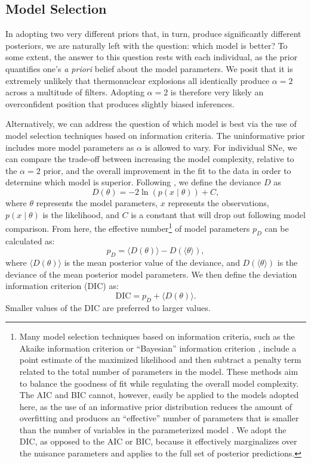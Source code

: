 \documentclass[twocolumn]{./aastex63}
\begin{document}
\subsection{Model Selection}\label{sec:dic}

In adopting two very different priors that, in turn, produce significantly
different posteriors, we are naturally left with the question: which model is
better? To some extent, the answer to this question rests with each
individual, as the prior quantifies one's \textit{a priori} belief about the
model parameters. We posit that it is extremely unlikely that thermonuclear
explosions all identically produce $\alpha = 2$ across a multitude of filters.
Adopting $\alpha = 2$ is therefore very likely an overconfident position that
produces slightly biased inferences.

Alternatively, we can address the question of which model is best via the use
of model selection techniques based on information criteria. The
uninformative prior includes more model parameters as $\alpha$ is allowed to
vary. For individual SNe, we can compare the trade-off between increasing the
model complexity, relative to the $\alpha = 2$ prior, and the overall
improvement in the fit to the data in order to determine which model is
superior. Following \citet{Spiegelhalter02}, we define the deviance $D$ as
%
$$D(\theta) = -2 \ln \left(p(x\mid \theta)\right) + C,$$
%
where $\theta$ represents the model parameters, $x$ represents the
observations, $p(x\mid \theta)$ is the likelihood, and $C$ is a constant that
will drop out following model comparison. From here, the effective
number\footnote{Many model selection techniques based on information criteria,
such as the Akaike information criterion \citep[AIC;][]{Akaike74} or
``Bayesian'' information criterion \citep[BIC;][]{Schwarz78}, include a point
estimate of the maximized likelihood and then subtract a penalty term related
to the total number of parameters in the model. These methods aim to balance
the goodness of fit while regulating the overall model complexity. The AIC and
BIC cannot, however, easily be applied to the models adopted here, as the use
of an informative prior distribution reduces the amount of overfitting and
produces an ``effective'' number of parameters that is smaller than the number
of variables in the parameterized model \citep{Gelman14}. We adopt the DIC, as
opposed to the AIC or BIC, because it effectively marginalizes over the
nuisance parameters and applies to the full set of posterior predictions.} of
model parameters $p_D$ can be calculated as:
%
$$p_D = \langle D(\theta) \rangle - D(\langle \theta \rangle),$$
%
where $\langle D(\theta) \rangle$ is the mean posterior value of the deviance,
and $D(\langle \theta \rangle)$ is the deviance of the mean posterior model
parameters. We then define the deviation information criterion (DIC) as:
%
$$\mathrm{DIC} = p_D + \langle D(\theta) \rangle.$$
% 
Smaller values of  the DIC are  preferred to larger values.
\end{document}
